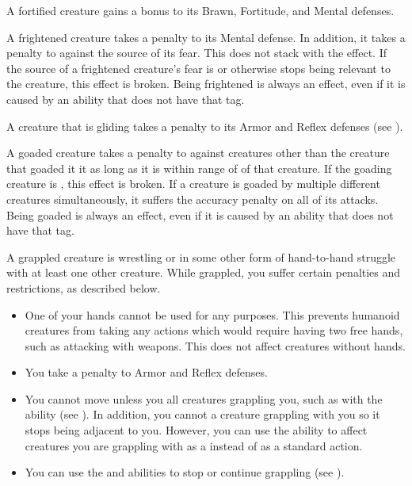    A fortified creature gains a  bonus to its Brawn, Fortitude, and Mental defenses.

   A frightened creature takes a  penalty to its Mental defense.
  In addition, it takes a  penalty to  against the source of its fear.
  This does not stack with the \panicked effect.
  If the source of a frightened creature's fear is  or otherwise stops being relevant to the creature, this effect is broken.
  Being frightened is always an  effect, even if it is caused by an ability that does not have that tag.

   A creature that is gliding takes a  penalty to its Armor and Reflex defenses (see ).

   A goaded creature takes a  penalty to  against creatures other than the creature that goaded it it as long as it is within \rngmed range of of that creature.
  If the goading creature is , this effect is broken.
  If a creature is goaded by multiple different creatures simultaneously, it suffers the accuracy penalty on all of its attacks.
  Being goaded is always an  effect, even if it is caused by an ability that does not have that tag.

   A grappled creature is wrestling or in some other form of hand-to-hand struggle with at least one other creature.
  While grappled, you suffer certain penalties and restrictions, as described below.
  \begin{itemize}
    \item One of your hands cannot be used for any purposes.
      This prevents humanoid creatures from taking any actions which would require having two free hands, such as attacking with  weapons.
      This does not affect creatures without hands.
    \item You take a  penalty to Armor and Reflex defenses.
    \item You cannot move unless you  all creatures grappling you, such as with the  ability (see ).
      In addition, you cannot  a creature grappling with you so it stops being adjacent to you.
      However, you can use the  ability to affect creatures you are grappling with as a  instead of as a standard action.
    \item You can use the  and  abilities to stop or continue grappling (see ).
  \end{itemize}

